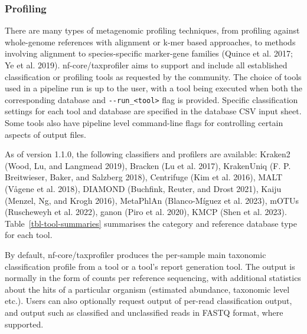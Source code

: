 \documentclass[
]{article}
\begin{document}
\hypertarget{profiling}{%
\subsubsection{Profiling}\label{profiling}}

There are many types of metagenomic profiling techniques, from profiling
against whole-genome references with alignment or k-mer based
approaches, to methods involving alignment to species-specific
marker-gene families (Quince et al. 2017; Ye et al. 2019).
nf-core/taxprofiler aims to support and include all established
classification or profiling tools as requested by the community. The
choice of tools used in a pipeline run is up to the user, with a tool
being executed when both the corresponding database and
\texttt{-\/-run\_\textless{}tool\textgreater{}} flag is provided.
Specific classification settings for each tool and database are
specified in the database CSV input sheet. Some tools also have pipeline
level command-line flags for controlling certain aspects of output
files.

As of version 1.1.0, the following classifiers and profilers are
available: Kraken2 (Wood, Lu, and Langmead 2019), Bracken (Lu et al.
2017), KrakenUniq (F. P. Breitwieser, Baker, and Salzberg 2018),
Centrifuge (Kim et al. 2016), MALT (Vågene et al. 2018), DIAMOND
(Buchfink, Reuter, and Drost 2021), Kaiju (Menzel, Ng, and Krogh 2016),
MetaPhlAn (Blanco-Míguez et al. 2023), mOTUs (Ruscheweyh et al. 2022),
ganon (Piro et al. 2020), KMCP (Shen et al. 2023).
Table~\ref{tbl-tool-summaries} summarises the category and reference
database type for each tool.

By default, nf-core/taxprofiler produces the per-sample main taxonomic
classification profile from a tool or a tool's report generation tool.
The output is normally in the form of counts per reference sequencing,
with additional statistics about the hits of a particular organism
(estimated abundance, taxonomic level etc.). Users can also optionally
request output of per-read classification output, and output such as
classified and unclassified reads in FASTQ format, where supported.
\end{document}
